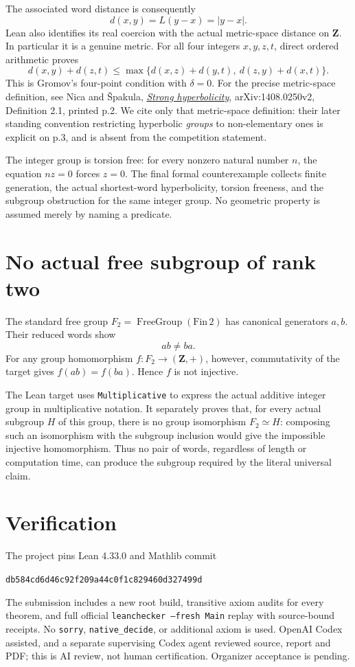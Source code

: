 \documentclass[11pt]{article}
\begin{document}
\newpage
The associated word distance is consequently
\[
 d(x,y)=L(y-x)=|y-x|.
\]
Lean also identifies its real coercion with the actual metric-space
distance on $\mathbf Z$. In particular it is a genuine metric.
For all four integers $x,y,z,t$, direct ordered arithmetic proves
\[
 d(x,y)+d(z,t)\le
 \max\{d(x,z)+d(y,t),\ d(z,y)+d(x,t)\}.
\]
This is Gromov's four-point condition with $\delta=0$.
For the precise metric-space definition, see Nica and \v{S}pakula,
\href{https://arxiv.org/abs/1408.0250v2}{\emph{Strong hyperbolicity}},
arXiv:1408.0250v2, Definition 2.1, printed p.2. We cite only that
metric-space definition: their later standing convention restricting
hyperbolic \emph{groups} to non-elementary ones is explicit on p.3,
and is absent from the competition statement.

The integer group is torsion free: for every nonzero natural number
$n$, the equation $nz=0$ forces $z=0$. The final formal counterexample
collects finite generation, the actual shortest-word hyperbolicity,
torsion freeness, and the subgroup obstruction for the same integer
group. No geometric property is assumed merely by naming a predicate.

\section{No actual free subgroup of rank two}
The standard free group $F_2=\operatorname{FreeGroup}(\mathrm{Fin}\,2)$
has canonical generators $a,b$. Their reduced words show
\[
 ab\ne ba.
\]
For any group homomorphism $f:F_2\to(\mathbf Z,+)$, however, commutativity
of the target gives $f(ab)=f(ba)$. Hence $f$ is not injective.

The Lean target uses \texttt{Multiplicative} to express the actual
additive integer group in multiplicative notation. It separately
proves that, for every actual subgroup $H$ of this group, there is no
group isomorphism $F_2\simeq H$: composing such an isomorphism with the
subgroup inclusion would give the impossible injective homomorphism.
Thus no pair of words, regardless of length or computation time, can
produce the subgroup required by the literal universal claim.

\section{Verification}
The project pins Lean 4.33.0 and Mathlib commit
\begin{center}\small\texttt{db584cd6d46c92f209a44c0f1c829460d327499d}\end{center}
The submission includes a new root build, transitive axiom audits for
every theorem, and full official \texttt{leanchecker --fresh Main}
replay with source-bound receipts. No \texttt{sorry},
\texttt{native\_decide}, or additional axiom is used. OpenAI Codex
assisted, and a separate supervising Codex agent reviewed source,
report and PDF; this is AI review, not human certification.
Organizer acceptance is pending.
\end{document}
